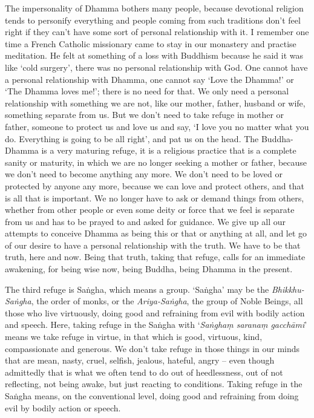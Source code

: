 The impersonality of Dhamma bothers many people, because devotional religion tends to personify everything and people coming from such traditions don't feel right if they can't have some sort of personal relationship with it. I remember one time a French Catholic missionary came to stay in our monastery and practise meditation. He felt at something of a loss with Buddhism because he said it was like `cold surgery', there was no personal relationship with God. One cannot have a personal relationship with Dhamma, one cannot say `Love the Dhamma!' or `The Dhamma loves me!'; there is no need for that. We only need a personal relationship with something we are not, like our mother, father, husband or wife, something separate from us.  But we don't need to take refuge in mother or father, someone to protect us and love us and say, `I love you no matter what you do. Everything is going to be all right', and pat us on the head. The Buddha-Dhamma is a very maturing refuge, it is a religious practice that is a complete sanity or maturity, in which we are no longer seeking a mother or father, because we don't need to become anything any more. We don't need to be loved or protected by anyone any more, because we can love and protect others, and that is all that is important. We no longer have to ask or demand things from others, whether from other people or even some deity or force that we feel is separate from us and has to be prayed to and asked for guidance.  We give up all our attempts to conceive Dhamma as being this or that or anything at all, and let go of our desire to have a personal relationship with the truth. We have to be that truth, here and now. Being that truth, taking that refuge, calls for an immediate awakening, for being wise now, being Buddha, being Dhamma in the present.

The third refuge is Sa\.ngha, which means a group. `Sa\.ngha' may be the \textit{Bhikkhu-Sa\.ngha}, the order of monks, or the \textit{Ariya-Sa\.ngha}, the group of Noble Beings, all those who live virtuously, doing good and refraining from evil with bodily action and speech. Here, taking refuge in the Sa\.ngha with `\textit{Sa\.ngha\d{m} sarana\d{m} gacch\=ami}' means we take refuge in virtue, in that which is good, virtuous, kind, compassionate and generous. We don't take refuge in those things in our minds that are mean, nasty, cruel, selfish, jealous, hateful, angry -- even though admittedly that is what we often tend to do out of heedlessness, out of not reflecting, not being awake, but just reacting to conditions. Taking refuge in the Sa\.ngha means, on the conventional level, doing good and refraining from doing evil by bodily action or speech.

